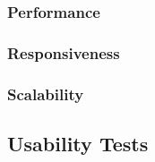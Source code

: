 \subsubsection{Performance}

\subsubsection{Responsiveness}

\subsubsection{Scalability}

\subsection{Usability Tests}
